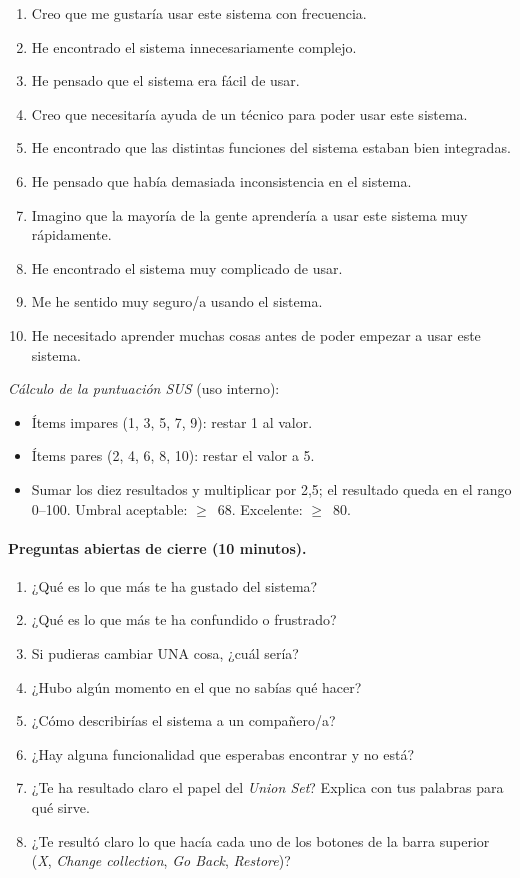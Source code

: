 \begin{enumerate}
\item Creo que me gustaría usar este sistema con frecuencia.
\item He encontrado el sistema innecesariamente complejo.
\item He pensado que el sistema era fácil de usar.
\item Creo que necesitaría ayuda de un técnico para poder usar este sistema.
\item He encontrado que las distintas funciones del sistema estaban bien integradas.
\item He pensado que había demasiada inconsistencia en el sistema.
\item Imagino que la mayoría de la gente aprendería a usar este sistema muy rápidamente.
\item He encontrado el sistema muy complicado de usar.
\item Me he sentido muy seguro/a usando el sistema.
\item He necesitado aprender muchas cosas antes de poder empezar a usar este sistema.
\end{enumerate}

\textit{Cálculo de la puntuación SUS} (uso interno):
\begin{itemize}
\item Ítems impares (1, 3, 5, 7, 9): restar 1 al valor.
\item Ítems pares (2, 4, 6, 8, 10): restar el valor a 5.
\item Sumar los diez resultados y multiplicar por 2{,}5; el resultado queda en el rango
  0--100. Umbral aceptable: $\geq$~68. Excelente: $\geq$~80.
\end{itemize}

\paragraph{Preguntas abiertas de cierre (10 minutos).}
\begin{enumerate}
\item ¿Qué es lo que más te ha gustado del sistema?
\item ¿Qué es lo que más te ha confundido o frustrado?
\item Si pudieras cambiar UNA cosa, ¿cuál sería?
\item ¿Hubo algún momento en el que no sabías qué hacer?
\item ¿Cómo describirías el sistema a un compañero/a?
\item ¿Hay alguna funcionalidad que esperabas encontrar y no está?
\item ¿Te ha resultado claro el papel del \textit{Union Set}? Explica con tus palabras para
  qué sirve.
\item ¿Te resultó claro lo que hacía cada uno de los botones de la barra superior
  (\textit{X}, \textit{Change collection}, \textit{Go Back}, \textit{Restore})?
\end{enumerate}

